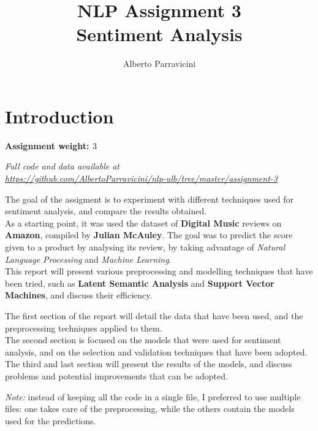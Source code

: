 \documentclass[
12pt,
a4paper,
oneside,
headinclude,
footinclude]{article}
\title{\textbf{NLP Assignment 3 \\ Sentiment Analysis}}
\author{{Alberto Parravicini}}
\date{}	%
\theoremstyle{definition} %
\begin{document}
\maketitle
{}
\setcounter{page}{1}

\section{Introduction}
\textbf{Assignment weight: $3$}

\textit{Full code and data available at\\ \href{https://github.com/AlbertoParravicini/nlp-ulb/tree/master/assignment-3}{https://github.com/AlbertoParravicini/nlp-ulb/tree/master/assignment-3}}

The goal of the assigment is to experiment with different techniques used for sentiment analysis, and compare the results obtained. \\
As a starting point, it was used the dataset of \textbf{Digital Music} reviews on \textbf{Amazon}, compiled by \textbf{Julian McAuley}. The goal was to predict the score given to a product by analysing its review, by taking advantage of \textit{Natural Language Processing} and \textit{Machine Learning}.\\
This report will present various preprocessing and modelling techniques that have been tried, such as \textbf{Latent Semantic Analysis} and \textbf{Support Vector Machines},
and discuss their efficiency.

The first section of the report will detail the data that have been used, and the preprocessing techniques applied to them.\\
The second section is focused on the models that were used for sentiment analysis, and on the selection and validation techniques that have been adopted.
The third and last section will present the results of the models, and discuss problems and potential improvements that can be adopted.

\newpage

\textit{Note:} instead of keeping all the code in a single file, I preferred to use multiple files: one takes care of the preprocessing, while the others contain the models used for the predictions. 
\end{document}
